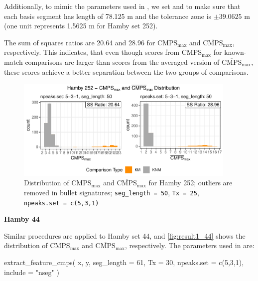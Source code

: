 Additionally, to mimic the parameters used in \citet{cmps}, we set
 and  to make sure that each basis
segment has length of 78.125 \textmu m and the tolerance zone is
\(\pm 39.0625\) \textmu m (one unit represents 1.5625 \textmu m for
Hamby set 252).

The sum of squares ratios are 20.64 and 28.96 for
\(\mathrm{CMPS_{max}}\) and \(\mathrm{\overline{CMPS}_{max}}\),
respectively. This indicates, that even though scores from
\(\mathrm{CMPS_{max}}\) for known-match comparisons are larger than
scores from the averaged version of \(\mathrm{\overline{CMPS}_{max}}\),
these scores achieve a better separation between the two groups of
comparisons.

\begin{Schunk}
\begin{figure}

{\centering \includegraphics[width=400px]{ju-hofmann_files/figure-latex/result1_252-1} 

}

\caption{Distribution of $\mathrm{CMPS_{max}}$ and $\mathrm{\overline{CMPS}_{max}}$ for Hamby 252; outliers are removed in bullet signatures; \texttt{seg\_length = 50}, \texttt{Tx = 25}, \texttt{npeaks.set = c(5,3,1)} }\label{fig:result1_252}
\end{figure}
\end{Schunk}

\textbf{Hamby 44}

Similar procedures are applied to Hamby set 44, and
\autoref{fig:result1_44} shows the distribution of
\(\mathrm{CMPS_{max}}\) and \(\mathrm{\overline{CMPS}_{max}}\),
respectively. The parameters used in  are:

\begin{Schunk}
\begin{Sinput}
extract_feature_cmps(
  x, y,
  seg_length = 61, 
  Tx = 30,
  npeaks.set = c(5,3,1),
  include = "nseg"
)
\end{Sinput}
\end{Schunk}

